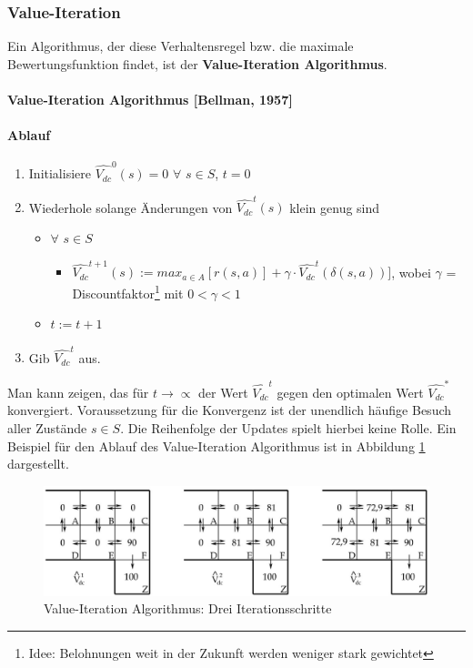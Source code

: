 \subsubsection{Value-Iteration}
Ein Algorithmus, der diese Verhaltensregel bzw. die maximale Bewertungsfunktion
findet, ist der \textbf{Value-Iteration Algorithmus}.

\paragraph{Value-Iteration Algorithmus [Bellman, 1957]}
\paragraph{Ablauf}
\begin{enumerate}
  \item Initialisiere $\hat{V_{dc}}^0(s) = 0$ $\forall$ $s \in S$, $t = 0$
  \item Wiederhole solange Änderungen von $\hat{V_{dc}}^t(s)$ klein genug sind
  \begin{itemize}
    \item $\forall$ $s \in S$
    \begin{itemize}
      \item $\hat{V_{dc}}^{t+1}(s) := max_{a \in A}[r(s,a)] + \gamma \cdot 
      \hat{V_{dc}}^{t}(\delta(s,a))]$, wobei $\gamma$ = Discountfaktor\footnote{Idee: Belohnungen weit in der
    Zukunft werden weniger stark gewichtet} mit  $0 < \gamma < 1$
    \end{itemize}
  	\item $t := t + 1$
  \end{itemize}
  \item Gib $\hat{V_{dc}}^t$ aus.
\end{enumerate}

Man kann zeigen, das für $t \to \propto$ der Wert $\hat{V_{dc}}^t$ gegen den
optimalen Wert $\hat{V_{dc}}^*$ konvergiert. Voraussetzung für die Konvergenz ist der
unendlich häufige Besuch aller Zustände $s \in S$. Die Reihenfolge der Updates
spielt hierbei keine Rolle. Ein Beispiel für den Ablauf des Value-Iteration
Algorithmus ist in Abbildung \ref{fig:Beispiel-Value-Iteration} dargestellt. 

\begin{figure}
	\centering
	\includegraphics[width=1.0\textwidth]{../images/value_iter_all.eps}
	\caption{Value-Iteration Algorithmus: Drei Iterationsschritte}
	\label{fig:Beispiel-Value-Iteration}
\end{figure}

